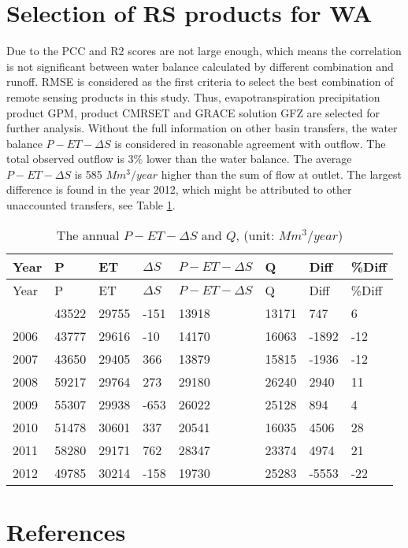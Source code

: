 \documentclass[oneside,openany]{article}%
\begin{document}
\section{Selection of RS products for WA}%
\label{sec:SelectionofRSproductsforWA}%
Due to the PCC and R2 scores are not large enough, which means the correlation is not significant between water balance calculated by different combination and runoff. RMSE is considered as the first criteria to select the best combination of remote sensing products in this study.%
\linebreak%
Thus, evapotranspiration precipitation product GPM, product CMRSET and GRACE solution GFZ are selected for further analysis.%
\linebreak%
Without the full information on other basin transfers, the water balance $P-ET-\Delta S$ is considered in reasonable agreement with outflow. The total observed outflow is 3\% lower than the water balance. The average $P-ET-\Delta S$ is 585 $Mm^3/year$ higher than the sum of flow at outlet. The largest difference is found in the year 2012, which might be attributed to other unaccounted transfers, see Table \ref{table:tab2}.%
\linebreak%
\begin{longtable}{|l|l|l|l|l|l|l|l|}%
\caption{The annual $P-ET-\Delta S$ and $Q$, (unit: $Mm^3/year$)}%
\label{table:tab2}\\%
\hline%
\textbf{Year}&\textbf{P}&\textbf{ET}&\textbf{$\Delta S$}&\textbf{$P-ET-\Delta S$}&\textbf{Q}&\textbf{Diff}&\textbf{\%Diff}\\%
\hline%
\endfirsthead%
\hline%
Year&P&ET&$\Delta S$&$P-ET-\Delta S$&Q&Diff&\%Diff\\%
\hline%
\endhead%
\hline%
\endfoot%
2005&43522&29755&{-}151&13918&13171&747&6\\%
2006&43777&29616&{-}10&14170&16063&{-}1892&{-}12\\%
2007&43650&29405&366&13879&15815&{-}1936&{-}12\\%
2008&59217&29764&273&29180&26240&2940&11\\%
2009&55307&29938&{-}653&26022&25128&894&4\\%
2010&51478&30601&337&20541&16035&4506&28\\%
2011&58280&29171&762&28347&23374&4974&21\\%
2012&49785&30214&{-}158&19730&25283&{-}5553&{-}22\\%
\end{longtable}

%
\newpage%
\section*{References}%
\label{sec:References}%
%
\printbibliography[heading=none]
\end{document}
